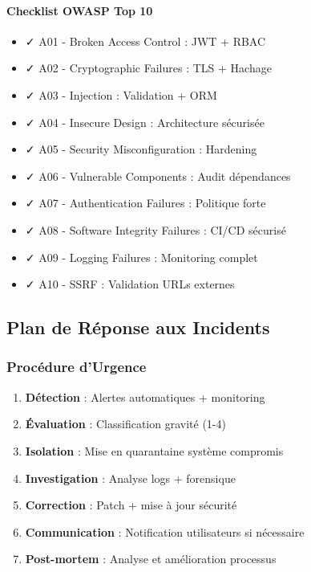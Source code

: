 \paragraph{Checklist OWASP Top 10}
\begin{itemize}
    \item ✓ A01 - Broken Access Control : JWT + RBAC
    \item ✓ A02 - Cryptographic Failures : TLS + Hachage
    \item ✓ A03 - Injection : Validation + ORM
    \item ✓ A04 - Insecure Design : Architecture sécurisée
    \item ✓ A05 - Security Misconfiguration : Hardening
    \item ✓ A06 - Vulnerable Components : Audit dépendances
    \item ✓ A07 - Authentication Failures : Politique forte
    \item ✓ A08 - Software Integrity Failures : CI/CD sécurisé
    \item ✓ A09 - Logging Failures : Monitoring complet
    \item ✓ A10 - SSRF : Validation URLs externes
\end{itemize}

\subsection{Plan de Réponse aux Incidents}

\subsubsection{Procédure d'Urgence}

\begin{enumerate}
    \item \textbf{Détection} : Alertes automatiques + monitoring
    \item \textbf{Évaluation} : Classification gravité (1-4)
    \item \textbf{Isolation} : Mise en quarantaine système compromis
    \item \textbf{Investigation} : Analyse logs + forensique
    \item \textbf{Correction} : Patch + mise à jour sécurité
    \item \textbf{Communication} : Notification utilisateurs si nécessaire
    \item \textbf{Post-mortem} : Analyse et amélioration processus
\end{enumerate}

